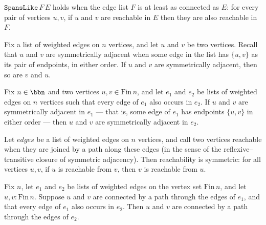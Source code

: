 \begin{definition}
\label{Kruskal.SpansLike}
\leanok
{}
$\mathtt{SpansLike}\,F\,E$ holds when the edge list $F$ is at least as connected as $E$:
for every pair of vertices $u, v$, if $u$ and $v$ are reachable in $E$ then they are
also reachable in $F$.
\end{definition}

\begin{lemma}
\label{Kruskal.symAdj_symm}
\leanok
{}
Fix a list of weighted edges on $n$ vertices, and let $u$ and $v$ be two vertices.
Recall that $u$ and $v$ are symmetrically adjacent when some edge in the list has $\{u,
v\}$ as its pair of endpoints, in either order. If $u$ and $v$ are symmetrically
adjacent, then so are $v$ and $u$.
\end{lemma}

\begin{lemma}
\label{Kruskal.symAdj_mono}
\leanok
{}
Fix $n \in \bbn$ and two vertices $u, v \in \mathrm{Fin}\,n$, and let $e_1$ and $e_2$ be
lists of weighted edges on $n$ vertices such that every edge of $e_1$ also occurs in
$e_2$. If $u$ and $v$ are symmetrically adjacent in $e_1$ — that is, some edge of $e_1$
has endpoints $\{u,v\}$ in either order — then $u$ and $v$ are symmetrically adjacent in
$e_2$.
\end{lemma}

\begin{lemma}
\label{Kruskal.reach_symm}
\leanok
{}
Let $\mathit{edges}$ be a list of weighted edges on $n$ vertices, and call two vertices
reachable when they are joined by a path along these edges (in the sense of the
reflexive–transitive closure of symmetric adjacency). Then reachability is symmetric:
for all vertices $u, v$, if $u$ is reachable from $v$, then $v$ is reachable from $u$.
\end{lemma}

\begin{lemma}
\label{Kruskal.reach_mono}
\leanok
{}
Fix $n$, let $e_1$ and $e_2$ be lists of weighted edges on the vertex set
$\mathrm{Fin}\,n$, and let $u, v : \mathrm{Fin}\,n$. Suppose $u$ and $v$ are connected
by a path through the edges of $e_1$, and that every edge of $e_1$ also occurs in $e_2$.
Then $u$ and $v$ are connected by a path through the edges of $e_2$.
\end{lemma}

